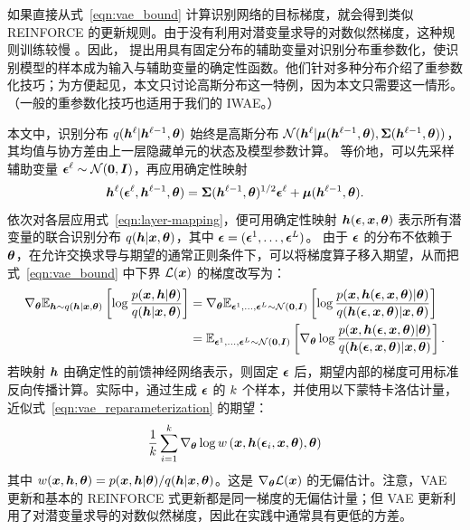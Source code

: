 如果直接从式~\eqref{eqn:vae_bound} 计算识别网络的目标梯度，就会得到类似 REINFORCE 的更新规则。由于没有利用对潜变量求导的对数似然梯度，这种规则训练较慢 \citep{helmholtz_machine,nvil}。因此，\citet{vae} 提出用具有固定分布的辅助变量对识别分布重参数化，使识别模型的样本成为输入与辅助变量的确定性函数。他们针对多种分布介绍了重参数化技巧；为方便起见，本文只讨论高斯分布这一特例，因为本文只需要这一情形。（一般的重参数化技巧也适用于我们的 IWAE。）

本文中，识别分布 $q(\bm{h}^{\ell}|\bm{h}^{\ell-1},{\bm{\theta}})$ 始终是高斯分布 $\mathcal{N}(\bm{h}^{\ell}|\bm{\mu}(\bm{h}^{\ell-1},{\bm{\theta}}),\bm{\Sigma}(\bm{h}^{\ell-1},{\bm{\theta}}))$，其均值与协方差由上一层隐藏单元的状态及模型参数计算。
等价地，可以先采样辅助变量 $\bm{\epsilon}^{\ell}\sim\mathcal{N}(\bm{0},\bm{I})$，再应用确定性映射
\begin{equation}
\bm{h}^{\ell}(\bm{\epsilon}^{\ell}, \bm{h}^{\ell-1}, {\bm{\theta}}) = \bm{\Sigma}(\bm{h}^{\ell-1}, {\bm{\theta}})^{1/2} \bm{\epsilon}^{\ell} + \bm{\mu}(\bm{h}^{\ell-1}, {\bm{\theta}}). \label{eqn:layer-mapping}
\end{equation}
依次对各层应用式~\eqref{eqn:layer-mapping}，便可用确定性映射 $\bm{h}(\bm{\epsilon},\bm{x},{\bm{\theta}})$ 表示所有潜变量的联合识别分布 $q(\bm{h}|\bm{x},{\bm{\theta}})$，其中 $\bm{\epsilon}=(\bm{\epsilon}^{1},\ldots,\bm{\epsilon}^{L})$。
由于 $\bm{\epsilon}$ 的分布不依赖于 ${\bm{\theta}}$，在允许交换求导与期望的通常正则条件下，可以将梯度算子移入期望，从而把式~\eqref{eqn:vae_bound} 中下界 $\mathcal{L}(\bm{x})$ 的梯度改写为：
\begin{align}
\nabla_{{\bm{\theta}}} \mathbb{E}_{\bm{h}\sim q(\bm{h}|\bm{x},{\bm{\theta}})} \left[ \log \frac{p(\bm{x},\bm{h}|{\bm{\theta}})}{q(\bm{h}|\bm{x},{\bm{\theta}})} \right] 
&= \nabla_{{\bm{\theta}}} \mathbb{E}_{\bm{\epsilon}^{1}, \ldots, \bm{\epsilon}^{L}\sim \mathcal{N}(\bm{0}, \bm{I})} \left[ \log \frac{p(\bm{x},\bm{h}(\bm{\epsilon}, \bm{x}, {\bm{\theta}})|{\bm{\theta}})}{q(\bm{h}(\bm{\epsilon}, \bm{x}, {\bm{\theta}})|\bm{x},{\bm{\theta}})} \right]\label{eq:source-05}
\\
&= \mathbb{E}_{\bm{\epsilon}^{1}, \ldots, \bm{\epsilon}^{L} \sim \mathcal{N}(\bm{0}, \bm{I})} \left[ \nabla_{{\bm{\theta}}}\log \frac{p(\bm{x},\bm{h}(\bm{\epsilon}, \bm{x}, {\bm{\theta}})|{\bm{\theta}})}{q(\bm{h}(\bm{\epsilon}, \bm{x}, {\bm{\theta}})|\bm{x},{\bm{\theta}})} \right]. \label{eqn:vae_reparameterization}
\end{align}
若映射 $\bm{h}$ 由确定性的前馈神经网络表示，则固定 $\bm{\epsilon}$ 后，期望内部的梯度可用标准反向传播计算。实际中，通过生成 $\bm{\epsilon}$ 的 $k$ 个样本，并使用以下蒙特卡洛估计量，近似式~\eqref{eqn:vae_reparameterization} 的期望：
\begin{equation}
\label{eqn:ksample_var_grad}
\frac{1}{k}\sum_{i=1}^k\nabla_{{\bm{\theta}}}\log w \left(\bm{x}, \bm{h}(\bm{\epsilon}_{i}, \bm{x}, {\bm{\theta}}), {\bm{\theta}}\right)
\end{equation}
其中 $w(\bm{x},\bm{h},{\bm{\theta}})=p(\bm{x},\bm{h}|{\bm{\theta}})/q(\bm{h}|\bm{x},{\bm{\theta}})$。这是 $\nabla_{\bm{\theta}}\mathcal{L}(\bm{x})$ 的无偏估计。注意，VAE 更新和基本的 REINFORCE 式更新都是同一梯度的无偏估计量；但 VAE 更新利用了对潜变量求导的对数似然梯度，因此在实践中通常具有更低的方差。
